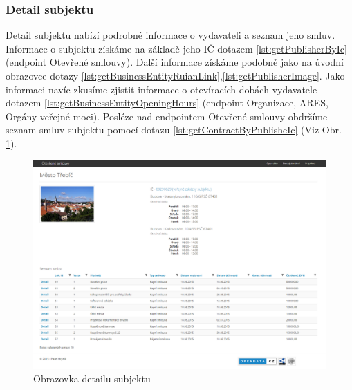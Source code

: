 









\subsubsection*{Detail subjektu}

Detail subjektu nabízí podrobné informace o vydavateli a seznam jeho smluv. Informace o subjektu získáme na základě jeho IČ dotazem \ref{lst:getPublisherByIc} (endpoint Otevřené smlouvy). Další informace získáme podobně jako na úvodní obrazovce dotazy \ref{lst:getBusinessEntityRuianLink},\ref{lst:getPublisherImage}. Jako informaci navíc zkusíme zjistit informace o otevíracích dobách vydavatele dotazem \ref{lst:getBusinessEntityOpeningHours} (endpoint Organizace, ARES, Orgány veřejné moci). Posléze nad endpointem Otevřené smlouvy obdržíme seznam smluv subjektu pomocí dotazu \ref{lst:getContractByPublisheIc} (Viz Obr. \ref{obr:webSubjectDetail}).\\

\begin{figure}[H]
\centerline{\includegraphics[width=\textwidth]{img/webSubjectDetail.eps}}
\caption{Obrazovka detailu subjektu}
\label{obr:webSubjectDetail}
\end{figure}

